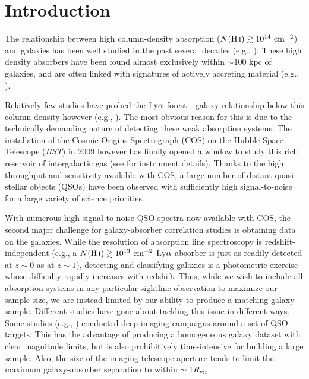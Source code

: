\cleardoublepage

\section{Introduction}

The relationship between high column-density \HI absorption ($N(\mbox{H\,{\sc i}}) \gtrsim 10^{14} ~\rm cm^{-2}$) and galaxies has been well studied in the past several decades (e.g., \citealt{lanzetta1995, bowen1998, bowen2002, chen2003, chen2005, chen2008, steidel2010, prochaska2011b, diamond-stanic2016}). These high density absorbers have been found almost exclusively within $\sim 100$ kpc of galaxies, and are often linked with signatures of actively accreting material (e.g., \citealt{diamond-stanic2016}). 

Relatively few studies have probed the $\rm Ly\alpha$-forest - galaxy relationship below this column density however (e.g., \citealt{bowen2002, morris2006, wakker2009, french2017}). The most obvious reason for this is due to the technically demanding nature of detecting these weak absorption systems. The installation of the Cosmic Origins Spectrograph (COS) on the Hubble Space Telescope (\emph{HST}) in 2009 however has finally opened a window to study this rich reservoir of intergalactic gas (see \citealt{green2012} for instrument details).  Thanks to the high throughput and sensitivity available with COS, a large number of distant quasi-stellar objects (QSOs) have been observed with sufficiently high signal-to-noise for a large variety of science priorities. 

With numerous high signal-to-noise QSO spectra now available with COS, the second major challenge for galaxy-absorber correlation studies is obtaining data on the galaxies. While the resolution of absorption line spectroscopy is redshift-independent (e.g., a $N(\mbox{H\,{\sc i}}) \gtrsim 10^{13}  ~\rm cm^{-2}$ $\rm Ly\alpha$ absorber is just as readily detected at $z\sim0$ as at $z\sim 1$), detecting and classifying galaxies is a photometric exercise whose difficulty rapidly increases with redshift. Thus, while we wish to include all absorption systems in any particular sightline observation to maximize our sample size, we are instead limited by our ability to produce a matching galaxy sample. Different studies have gone about tackling this issue in different ways. Some studies (e.g., \citealt{bowen2002, chen2005, tumlinson2011, tumlinson2013, werk2013}) conducted deep imaging campaigns around a set of QSO targets. This has the advantage of producing a homogeneous galaxy dataset with clear magnitude limits, but is also prohibitively time-intensive for building a large sample. Also, the size of the imaging telescope aperture tends to limit the maximum galaxy-absorber separation to within $\sim 1 R_{\rm vir}$. 

